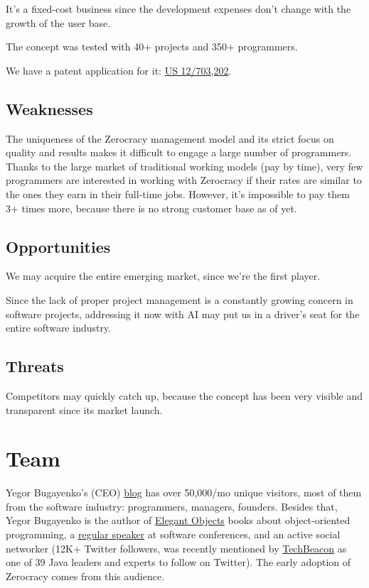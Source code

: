 \documentclass{main}
\begin{document}
It's a fixed-cost business since the development expenses don't change
with the growth of the user base.

The concept was tested with 40+ projects and 350+ programmers.

We have a patent application for it:
\href{https://patents.google.com/patent/US20110196798}{US 12/703,202}.

\subsection{Weaknesses}

The uniqueness of the Zerocracy management model and its strict focus on quality
and results makes it difficult to engage a large number of programmers. Thanks
to the large market of traditional working models (pay by time), very few
programmers are interested in working with Zerocracy if their rates are
similar to the ones they earn in their full-time jobs. However, it's impossible
to pay them 3+ times more, because there is no strong customer base as of yet.

\subsection{Opportunities}

We may acquire the entire emerging market, since we're the first player.

Since the lack of proper project management is a constantly growing concern in
software projects, addressing it now with AI may put us in a driver's seat for
the entire software industry.

\subsection{Threats}

Competitors may quickly catch up, because the concept has been very visible and
transparent since its market launch.

\section{Team}

Yegor Bugayenko's (CEO) \href{http://www.yegor256.com}{blog} has over 50,000/mo unique visitors, most of them from the
software industry: programmers, managers, founders. Besides that, Yegor
Bugayenko is the author of \href{https://amzn.to/2bYXQy7}{Elegant Objects} books about object-oriented
programming, a \href{https://lanyrd.com/profile/yegor256/}{regular speaker} at software conferences, and an active social
networker (12K+ Twitter followers, was recently mentioned by \href{https://techbeacon.com/java-leaders-you-should-follow-twitter}{TechBeacon} as one
of 39 Java leaders and experts to follow on Twitter). The
early adoption of Zerocracy comes from this audience.
\end{document}
